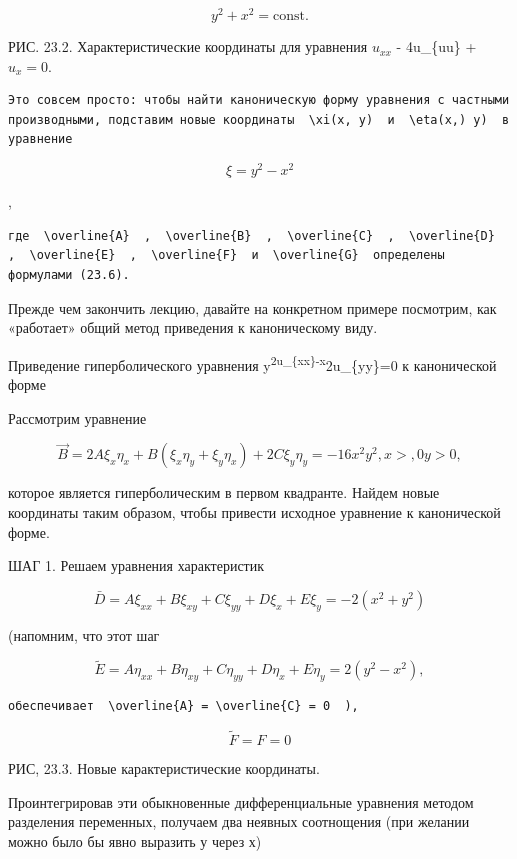 \documentclass[
  ukrainian,
]{article}
\begin{document}
\[
y^2 + x^2 = \text{const}.
\]

РИС. 23.2. Характеристические координаты для уравнения \(u_{xx}\) -
4u\_\{uu\} + \(u_x = 0\).

\begin{verbatim}
Это совсем просто: чтобы найти каноническую форму уравнения с частными производными, подставим новые координаты  \xi(x, y)  и  \eta(x,) y)  в уравнение
\end{verbatim}

\[
\xi = y^2 - x^2
\]

,

\begin{verbatim}
где  \overline{A}  ,  \overline{B}  ,  \overline{C}  ,  \overline{D}  ,  \overline{E}  ,  \overline{F}  и  \overline{G}  определены формулами (23.6).
\end{verbatim}

Прежде чем закончить лекцию, давайте на конкретном примере посмотрим,
как «работает» общий метод приведения к каноническому виду.

Приведение гиперболического уравнения
y\textsuperscript{2u\_\{xx\}-x}2u\_\{yy\}=0 к канонической форме

Рассмотрим уравнение

\[
\vec{B} = 2A\xi_x\eta_x + B(\xi_x\eta_y + \xi_y\eta_x) + 2C\xi_y\eta_y = -16x^2y^2
,  x>  ,  0 y>0  ,
\]

которое является гиперболическим в первом квадранте. Найдем новые
координаты таким образом, чтобы привести исходное уравнение к
канонической форме.

ШАГ 1. Решаем уравнения характеристик

\[
\bar{D} = A\xi_{xx} + B\xi_{xy} + C\xi_{yy} + D\xi_x + E\xi_y = -2(x^2 + y^2)
\]

(напомним, что этот шаг

\[
\widetilde{E} = A\eta_{xx} + B\eta_{xy} + C\eta_{yy} + D\eta_x + E\eta_y = 2(y^2 - x^2),
\]

\begin{verbatim}
обеспечивает  \overline{A} = \overline{C} = 0  ),
\end{verbatim}

\[
\tilde{F} = F = 0
\]

РИС, 23.3. Новые карактеристические координаты.

Проинтегрировав эти обыкновенные дифференциальные уравнения методом
разделения переменных, получаем два неявных соотнощения (при желании
можно было бы явно выразить у через х)
\end{document}
